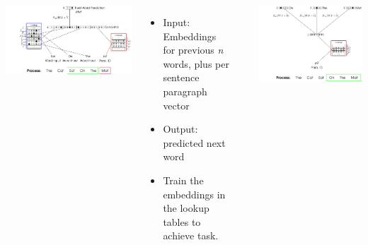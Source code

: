 \documentclass[a0paper, landscape]{tikzposter}
\begin{document}
\begin{columns}
{		
		{
			\begin{minipage}[t]{0.48\linewidth}
			     \begin{tikzfigure}
				     	\includegraphics[width=\textwidth]{pvdm/PVDM3_poster}
			     \end{tikzfigure}				
			\end{minipage}%
			\hfill
			\begin{adjustbox}{valign=t}
				\begin{minipage}[t]{0.48\linewidth}
				\begin{itemize}
					\item Input: Embeddings for previous \emph n words, plus per sentence paragraph vector
					\item Output: predicted next word
					\item Train the embeddings in the lookup tables to achieve task.
				\end{itemize}
				 \small\cite{le2014distributed}
				\end{minipage}
			\end{adjustbox}
		 }
	  	\vspace{2ex}
		{
			\begin{minipage}[t]{0.48\linewidth}
				\begin{tikzfigure}
					\includegraphics[width=\textwidth]{pvdbow/PVDBOW_poster}

\end{tikzfigure}
\end{minipage}}}
\end{columns}
\end{document}
